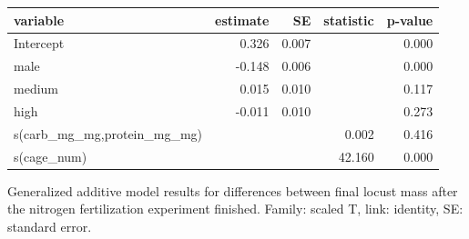 \documentclass[
]{article}
\begin{document}
\begin{tbl}

\begin{minipage}{\linewidth}

\begingroup
\fontsize{12.0pt}{14.4pt}\selectfont
\begin{longtable*}{lrrrr}
\toprule
variable & estimate & SE & statistic & p-value \\ 
\midrule\addlinespace[2.5pt]
Intercept & 0.326 & 0.007 &  & 0.000 \\ 
male & -0.148 & 0.006 &  & 0.000 \\ 
medium & 0.015 & 0.010 &  & 0.117 \\ 
high & -0.011 & 0.010 &  & 0.273 \\ 
s(carb\_mg\_mg,protein\_mg\_mg) &  &  & 0.002 & 0.416 \\ 
s(cage\_num) &  &  & 42.160 & 0.000 \\ 
\bottomrule
\end{longtable*}
\endgroup

\end{minipage}%

\caption{\label{tbl-field-cage-locust-mass}Generalized additive model
results for differences between final locust mass after the nitrogen
fertilization experiment finished. Family: scaled T, link: identity, SE:
standard error.}

\end{tbl}%
\end{document}
